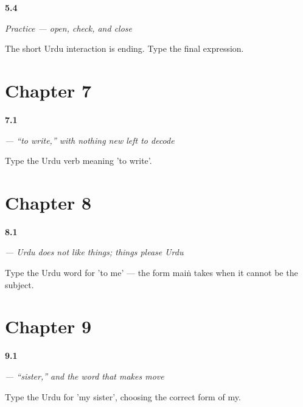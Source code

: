 \noindent\begin{minipage}[t]{\linewidth}
\raggedright
\hypertarget{review-UR-C05-practice-final-line}{\textbf{5.4}} \emph{Practice — open, check, and close}\par
\small The short Urdu interaction is ending. Type the final expression.
\end{minipage}\par\medskip

\section*{Chapter 7}

\noindent\begin{minipage}[t]{\linewidth}
\raggedright
\hypertarget{review-UR-C07-likhna-four-stems}{\textbf{7.1}} \emph{ — “to write,” with nothing new left to decode}\par
\small Type the Urdu verb meaning 'to write'.
\end{minipage}\par\medskip

\section*{Chapter 8}

\noindent\begin{minipage}[t]{\linewidth}
\raggedright
\hypertarget{review-UR-C08-pasand-dative}{\textbf{8.1}} \emph{ — Urdu does not like things; things please Urdu}\par
\small Type the Urdu word for 'to me' — the form maiṅ takes when it cannot be the subject.
\end{minipage}\par\medskip

\section*{Chapter 9}

\noindent\begin{minipage}[t]{\linewidth}
\raggedright
\hypertarget{review-UR-C09-bahan-agreement}{\textbf{9.1}} \emph{ — \textquotedblleft{}sister,\textquotedblright{} and the word that makes  move}\par
\small Type the Urdu for 'my sister', choosing the correct form of my.
\end{minipage}\par\medskip

